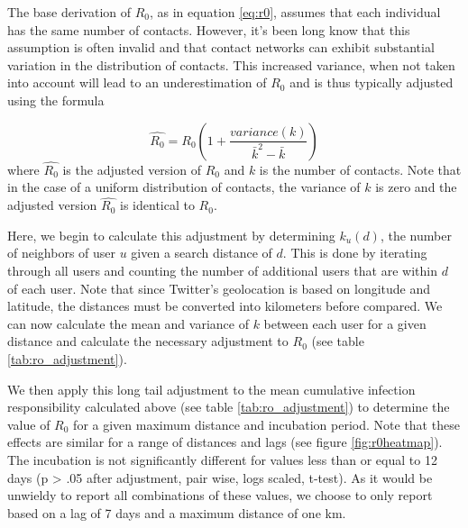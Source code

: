 
The base derivation of \(R_0\), as in equation \ref{eq:r0}, assumes that each individual has the same number of contacts. However, it's been long know that this assumption is often invalid and that contact networks can exhibit substantial variation in the distribution of contacts. This increased variance, when not taken into account will lead to an underestimation of  \(R_0\) \cite{newman2003social,olinky2004unexpected,molina2012modelling} and is thus typically adjusted using the formula 

\begin{equation}
\hat{R_0} = R_0 \left(1 + \frac{variance(k)}{\bar{k}^2 - \bar{k}}\right)
\end{equation}
where \(\hat{R_0}\) is the adjusted version of \(R_0\) and \(k\) is the number of contacts.\cite{newman2003social,molina2012modelling} Note that in the case of a uniform distribution of contacts, the variance of \(k\) is zero and the adjusted version  \(\hat{R_0}\) is identical to \(R_0\). 

Here, we begin to calculate this adjustment by determining \(k_u(d)\), the number of neighbors of user \(u\) given a search distance of \(d\). This is done by iterating through all users and counting the number of additional users that are within \(d\) of each user. Note that since Twitter's geolocation is based on longitude and latitude, the distances must be converted into kilometers before compared. We can now calculate the mean and variance of \(k\) between each user for a given distance and  calculate the necessary adjustment to \(R_0\) (see table \ref{tab:ro_adjustment}).


We then apply this long tail adjustment to the mean cumulative infection responsibility calculated above (see table \ref{tab:ro_adjustment}) to determine the value of \(R_0\) for a given maximum distance and incubation period. Note that these effects are similar for a range of distances and lags (see figure \ref{fig:r0heatmap}). The incubation is not significantly different for values less than or equal to 12 days (p > .05 after adjustment, pair wise, logs scaled, t-test). As it would be unwieldy to report all combinations of these values, we choose to only report based on a lag of 7 days and a maximum distance of one km.



